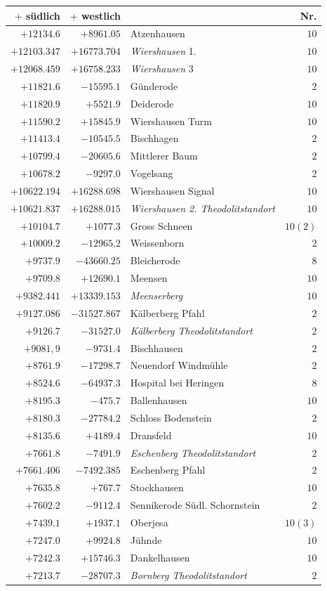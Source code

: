 \begin{center}\begingroup\fontsize{8}{9}\selectfont
\setlength{\tabcolsep}{4pt}
\begin{tabular}{r|r|p{170pt}|r}\hline
\(+\) südlich&\(+\) westlich&&Nr.\\\hline
\(+12134.6\)&\(+8961.05\)&Atzenhausen&\(10\)\\
\(+12103.347\)&\(+16773.704\)&\textit{Wiershausen} 1.&\(10\)\\
\(+12068.459\)&\(+16758.233\)&\textit{Wiershausen} 3&\(10\)\\
\(+11821.6\)&\(-15595.1\)&Günderode&\(2\)\\
\(+11820.9\)&\(+5521.9\)&Deiderode&\(10\)\\
\(+11590.2\)&\(+15845.9\)&Wiershausen Turm&\(10\)\\
\(+11413.4\)&\(-10545.5\)&Bischhagen&\(2\)\\
\(+10799.4\)&\(-20605.6\)&Mittlerer Baum&\(2\)\\
\(+10678.2\)&\(-9297.0\)&Vogelsang&\(2\)\\
\(+10622.194\)&\(+16288.698\)&Wiershausen Signal&\(10\)\\
\(+10621.837\)&\(+16288.015\)&\textit{Wiershausen 2. Theodolitstandort}&\(10\)\\
\(+10104.7\)&\(+1077.3\)&Gross Schneen&\(10(2)\)\\
\(+10009.2\)&\(-12965.2\)&Weissenborn&\(2\)\\
\(+9737.9\)&\(-43660.25\)&Bleicherode&\(8\)\\
\(+9709.8\)&\(+12690.1\)&Meensen&\(10\)\\
\(+9382.441\)&\(+13339.153\)&\textit{Meenserberg}&\(10\)\\
\(+9127.086\)&\(-31527.867\)&Kälberberg Pfahl&\(2\)\\
\(+9126.7\)&\(-31527.0\)&\textit{Kälberberg Theodolitstandort}&\(2\)\\
\(+9081{,}9\)&\(-9731.4\)&Bischhausen&\(2\)\\
\(+8761.9\)&\(-17298.7\)&Neuendorf Windmühle&\(2\)\\
\(+8524.6\)&\(-64937.3\)&Hospital bei Heringen&\(8\)\\
\(+8195.3\)&\(-475.7\)&Ballenhausen&\(10\)\\
\(+8180.3\)&\(-27784.2\)&Schloss Bodenstein&\(2\)\\
\(+8135.6\)&\(+4189.4\)&Dransfeld&\(10\)\\
\(+7661.8\)&\(-7491.9\)&\textit{Eschenberg Theodolitstandort}&\(2\)\\
\(+7661.406\)&\(-7492.385\)&Eschenberg Pfahl&\(2\)\\
\(+7635.8\)&\(+767.7\)&Stockhausen&\(10\)\\
\(+7602.2\)&\(-9112.4\)&Sennikerode Südl. Schornstein&\(2\)\\
\(+7439.1\)&\(+1937.1\)&Oberjesa&\(10(3)\)\\
\(+7247.0\)&\(+9924.8\)&Jühnde&\(10\)\\
\(+7242.3\)&\(+15746.3\)&Dankelhausen&\(10\)\\
\(+7213.7\)&\(-28707.3\)&\textit{Bornberg Theodolitstandort}&\(2\)\\
\hline\end{tabular}\endgroup\end{center}
